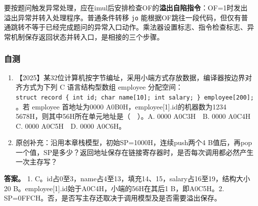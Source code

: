 要按题问触发异常处理，应在imul后安排检查OF的\textbf{溢出自陷指令}：OF=1时发出溢出异常并转入处理程序。普通条件转移 \texttt{jo} 能根据OF跳往一段代码，但仅有普通跳转不等于已经完成题问的异常入口动作。乘法器设置标志、指令检查标志、异常机制保存返回状态并转入口，是相接的三个步骤。

\subsubsection{自测}\label{co-self4}

\begin{enumerate}
\def\labelenumi{\arabic{enumi}.}
\tightlist
\item
  【2025】某32位计算机按字节编址，采用小端方式存放数据，编译器按边界对齐方式为下列 C 语言结构型数组 employee 分配空间：\texttt{struct\ record\ \{\ int\ id;}\allowbreak{}\texttt{\ char\ name{[}10{]};}\allowbreak{}\texttt{\ int\ salary;}\allowbreak{}\texttt{\ \}\ employee{[}200{]};}\allowbreak{}。若 employee 首地址为0000 A0B0H，employee{[}1{]}.id的机器数为1234 5678H，则其中56H所在单元地址是（　）。A. 0000 A0C3H　B. 0000 A0C4H　C. 0000 A0C5H　D. 0000 A0C6H。
\item
  原创补充：沿用本章栈模型，初始SP=1000H，连续push两个4 B值后，再pop一个值，SP是多少？返回地址保存在链接寄存器时，是否每次调用都必然产生一次主存写？
\end{enumerate}

\textbf{答案。} 1. C。id占0至3，name占4至13，填充14、15，salary占16至19，结构大小20 B。employee{[}1{]}.id始于A0C4H，小端的56H在其后1 B，即A0C5H。2. SP=0FFCH。否，是否写主存还取决于调用模型及是否需要溢出保存。
